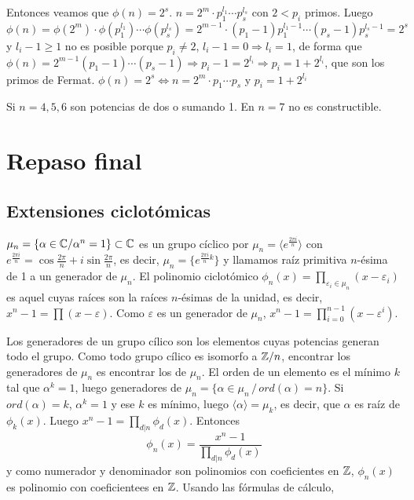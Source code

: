  Entonces veamos que $\phi(n) = 2^s$. $n = 2^m \cdot p_1^{l_1} \cdots  p_s^{l_s}$  con $2<p_i$ primos. Luego $\phi(n) = \phi(2^m) \cdot \phi( p_1^{l_1}) \cdots \phi(p_s^{l_s}) = 2^{m-1} \cdot (p_1-1) p_1^{l_1-1} \cdots (p_s-1) p_s^{l_s-1} = 2^s$ y $l_i-1 \ge 1$ no es posible porque $p_i \neq 2$, $l_i-1=0\Rightarrow l_i=1$, de forma que 
 $\phi(n) = 2^{m-1} (p_1-1) \cdots (p_s-1) \Rightarrow p_i-1=2^{l_i} \Rightarrow p_i = 1+2^{l_i}$, que son los primos de Fermat. $\phi(n) =2^s \iff n =2^m \cdot p_1 \cdots p_s$ y $p_i=1+2^{l_i}$

 \begin{ejem}
    Si $n=4,5,6$ son potencias de dos o sumando 1. En $n=7$ no es constructible. 
 \end{ejem}
\chapter{Repaso final}
\section{Extensiones ciclot\'omicas}
$\mu_n = \{ \alpha \in \mathbb{C} / \alpha^n = 1\} \subset \mathbb{C}$ es un grupo c\'iclico por $\mu_n = \langle e^{\frac{2\pi i}{n}} \rangle$ con $e^{\frac{2\pi i}{n}} = \cos \frac{2\pi}{n} + i \sin \frac{2\pi}{n}$, es decir, $\mu_n = \{e^{\frac{2\pi i}{n} k}\}$ y llamamos ra\'iz primitiva $n$-\'esima de 1 a un generador de $\mu_n$. El polinomio ciclot\'omico $\phi_n(x) = \prod_{\varepsilon_i \in \mu_n} (x-\varepsilon_i)$ es aquel cuyas ra\'ices son la ra\'ices $n$-\'esimas de la unidad, es decir, $x^n-1 = \prod(x-\varepsilon)$. Como $\varepsilon$ es un generador de $\mu_n$, $x^n-1=\prod_{i=0}^{n-1}(x-\varepsilon^i)$.

Los generadores de un grupo c\'ilico son los elementos cuyas potencias generan todo el grupo. Como todo grupo c\'ilico es isomorfo a $\mathbb{Z}/n$, encontrar los generadores de $\mu_n$ es encontrar los de $\mu_n$. El orden de un elemento es el m\'inimo $k$ tal que $\alpha^k=1$, luego generadores de $\mu_n = \{\alpha \in \mu_n \, / \, ord(\alpha) = n\}$. Si $ord(\alpha) = k$, $\alpha^k=1$ y ese $k$ es m\'inimo, luego $\langle \alpha \rangle = \mu_k$, es decir, que $\alpha$ es ra\'iz de $\phi_k(x)$. Luego $x^n-1 =\displaystyle \prod_{d|n} \phi_d(x)$. Entonces
$$\phi_n(x) = \frac{x^n-1}{\displaystyle \prod_{d|n} \phi_d(x)}$$
y como numerador y denominador son polinomios con coeficientes en $\mathbb{Z}$, $\phi_n(x)$ es polinomio con coeficientees en $\mathbb{Z}$. Usando las f\'ormulas de c\'alculo, 

